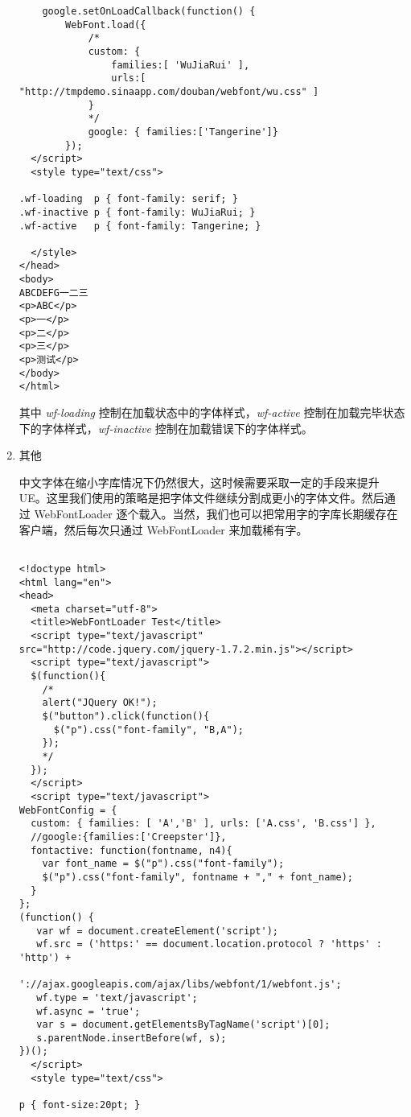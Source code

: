 \documentclass[a4paper,12pt]{report}
\begin{document}
\begin{enumerate}
\begin{verbatim}
    google.setOnLoadCallback(function() {
        WebFont.load({
            /*
            custom: { 
                families:[ 'WuJiaRui' ],
                urls:[ "http://tmpdemo.sinaapp.com/douban/webfont/wu.css" ]
            }
            */
            google: { families:['Tangerine']}
        });
  </script>
  <style type="text/css">

.wf-loading  p { font-family: serif; }
.wf-inactive p { font-family: WuJiaRui; }
.wf-active   p { font-family: Tangerine; }

  </style>
</head>
<body>
ABCDEFG一二三
<p>ABC</p>
<p>一</p>
<p>二</p>
<p>三</p>
<p>测试</p>
</body>
</html>

\end{verbatim}

其中 \emph{wf-loading} 控制在加载状态中的字体样式，\emph{wf-active} 控制在加载完毕状态下的字体样式，\emph{wf-inactive} 控制在加载错误下的字体样式。

\item 其他

中文字体在缩小字库情况下仍然很大，这时候需要采取一定的手段来提升 UE。这里我们使用的策略是把字体文件继续分割成更小的字体文件。然后通过 WebFontLoader 逐个载入。当然，我们也可以把常用字的字库长期缓存在客户端，然后每次只通过 WebFontLoader 来加载稀有字。

\begin{verbatim}

<!doctype html>
<html lang="en">
<head>
  <meta charset="utf-8">
  <title>WebFontLoader Test</title>
  <script type="text/javascript" src="http://code.jquery.com/jquery-1.7.2.min.js"></script>
  <script type="text/javascript">
  $(function(){
    /*
    alert("JQuery OK!");
    $("button").click(function(){
      $("p").css("font-family", "B,A");
    });
    */
  });
  </script>
  <script type="text/javascript">
WebFontConfig = {
  custom: { families: [ 'A','B' ], urls: ['A.css', 'B.css'] },
  //google:{families:['Creepster']},
  fontactive: function(fontname, n4){
    var font_name = $("p").css("font-family");
    $("p").css("font-family", fontname + "," + font_name);
  }
};
(function() {
   var wf = document.createElement('script');
   wf.src = ('https:' == document.location.protocol ? 'https' : 'http') +
                  '://ajax.googleapis.com/ajax/libs/webfont/1/webfont.js';
   wf.type = 'text/javascript';
   wf.async = 'true';
   var s = document.getElementsByTagName('script')[0];
   s.parentNode.insertBefore(wf, s);
})();
  </script>
  <style type="text/css">

p { font-size:20pt; }


\end{verbatim}
\end{enumerate}
\end{document}
